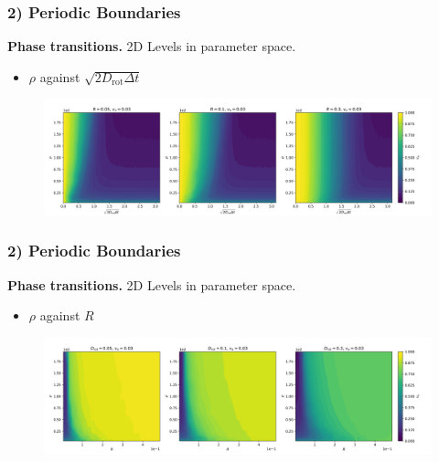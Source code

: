 \begin{frame}
	\frametitle{2) Periodic Boundaries}
	\textbf{Phase transitions.} 2D Levels in parameter space.
	\begin{itemize}
	    \item $\rho$ against $\sqrt{2D_{\text{rot}}\Delta t}$
	\end{itemize}
	\begin{figure}[H]
  		\includegraphics[width=\textwidth]{images/chapter2/rho_eta_transition_2D_plots_r_comparison.png} 
	\end{figure}
\end{frame}

\begin{frame}
	\frametitle{2) Periodic Boundaries}
	\textbf{Phase transitions.} 2D Levels in parameter space.
	\begin{itemize}
	    \item $\rho$ against $R$
	\end{itemize}
	\begin{figure}[H]
  		\includegraphics[width=\textwidth]{images/chapter2/rho_r_transition_2D_plots_D_comparison.png} 
	\end{figure}
\end{frame}